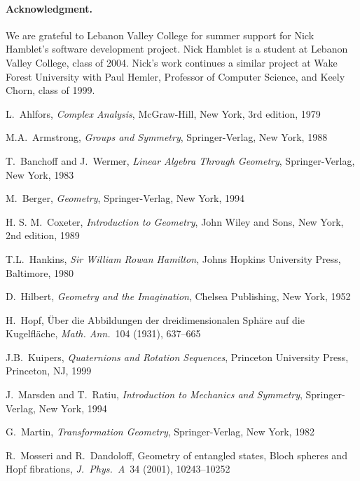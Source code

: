 \documentclass[11pt]{article}
\begin{document}
\paragraph*{Acknowledgment.}
We are grateful to Lebanon Valley College for summer support for Nick
Hamblet's software development project.  Nick Hamblet is a student at
Lebanon Valley College, class of 2004.  Nick's work continues a similar
project at Wake Forest University with Paul Hemler, Professor of Computer
Science, and Keely Chorn, class of 1999.

\begin{thebibliography}{99}

L.~Ahlfors, {\it Complex Analysis}, McGraw-Hill, New York, 3rd edition, 1979

M.A.~Armstrong, {\it Groups and Symmetry}, Springer-Verlag, New York,
1988

T.~Banchoff and J.~Wermer, {\it Linear Algebra Through Geometry},
Springer-Verlag, New York, 1983

M.~Berger, {\it Geometry}, Springer-Verlag, New York, 1994

H. S. M.~Coxeter, {\it Introduction to Geometry}, John Wiley and Sons,
New York, 2nd edition, 1989


T.L.~Hankins, {\it Sir William Rowan Hamilton}, Johns Hopkins University
Press, Baltimore, 1980

D.~Hilbert, {\it Geometry and the Imagination}, Chelsea Publishing,
New York, 1952

H.~Hopf, \"Uber die Abbildungen der dreidimensionalen Sph\"are auf die
Kugelfl\"ache,  {\it Math. Ann.}~104 (1931), 637--665

J.B.~Kuipers, {\it Quaternions and Rotation Sequences}, Princeton
University Press, Princeton, NJ, 1999

J.~Marsden and T.~Ratiu, {\it Introduction to Mechanics and Symmetry},
Springer-Verlag, New York, 1994

G.~Martin, {\it Transformation Geometry}, Springer-Verlag, New York,
1982

R.~Mosseri and R.~Dandoloff, Geometry of entangled states, Bloch spheres
and Hopf fibrations,  {\it J.~Phys.~A}~34 (2001), 10243--10252


\end{thebibliography}
\end{document}
